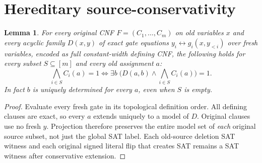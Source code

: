 \documentclass[11pt]{article}
\newtheorem{lemma}[theorem]{Lemma}
\begin{document}
\section*{Hereditary source-conservativity}
\begin{lemma}
For every original CNF $F=(C_1,\ldots,C_m)$ on old variables $x$ and every acyclic family $D(x,y)$ of exact gate equations $y_i\leftrightarrow g_i(x,y_{<i})$ over fresh variables, encoded as full constant-width defining CNF, the following holds for every subset $S\subseteq[m]$ and every old assignment $a$:
\[
\bigwedge_{i\in S}C_i(a)=1
\iff
\exists b\;\bigl(D(a,b)\land\bigwedge_{i\in S}C_i(a)\bigr)=1.
\]
In fact $b$ is uniquely determined for every $a$, even when $S$ is empty.
\end{lemma}
\begin{proof}
Evaluate every fresh gate in its topological definition order. All defining clauses are exact, so every $a$ extends uniquely to a model of $D$. Original clauses use no fresh $y$. Projection therefore preserves the entire model set of \emph{each} original source subset, not just the global SAT label. Each old-source deletion SAT witness and each original signed literal flip that creates SAT remains a SAT witness after conservative extension.
\end{proof}
\end{document}
